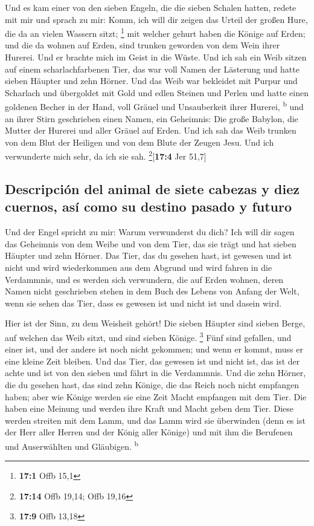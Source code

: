  Und es kam einer von den sieben Engeln, die die sieben
Schalen hatten, redete mit mir und sprach zu mir: Komm, ich will dir
zeigen das Urteil der großen Hure, die da an vielen Wassern sitzt;
\footnote{\textbf{17:1} Offb 15,1}  mit welcher gehurt
haben die Könige auf Erden; und die da wohnen auf Erden, sind trunken
geworden von dem Wein ihrer Hurerei.  Und er brachte mich
im Geist in die Wüste. Und ich sah ein Weib sitzen auf einem
scharlachfarbenen Tier, das war voll Namen der Lästerung und hatte
sieben Häupter und zehn Hörner.  Und das Weib war
bekleidet mit Purpur und Scharlach und übergoldet mit Gold und edlen
Steinen und Perlen und hatte einen goldenen Becher in der Hand, voll
Gräuel und Unsauberkeit ihrer Hurerei, \textsuperscript{b}
 und an ihrer Stirn geschrieben einen Namen, ein
Geheimnis: Die große Babylon, die Mutter der Hurerei und aller Gräuel
auf Erden.  Und ich sah das Weib trunken von dem Blut der
Heiligen und von dem Blute der Zeugen Jesu. Und ich verwunderte mich
sehr, da ich sie sah. \footnote{\textbf{17:14} Offb 19,14; Offb 19,16}{[}\textbf{17:4}
Jer 51,7{]}

\hypertarget{descripciuxf3n-del-animal-de-siete-cabezas-y-diez-cuernos-asuxed-como-su-destino-pasado-y-futuro}{%
\subsection{Descripción del animal de siete cabezas y diez cuernos, así
como su destino pasado y
futuro}\label{descripciuxf3n-del-animal-de-siete-cabezas-y-diez-cuernos-asuxed-como-su-destino-pasado-y-futuro}}

 Und der Engel spricht zu mir: Warum verwunderst du dich?
Ich will dir sagen das Geheimnis von dem Weibe und von dem Tier, das sie
trägt und hat sieben Häupter und zehn Hörner.  Das Tier,
das du gesehen hast, ist gewesen und ist nicht und wird wiederkommen aus
dem Abgrund und wird fahren in die Verdammnis, und es werden sich
verwundern, die auf Erden wohnen, deren Namen nicht geschrieben stehen
in dem Buch des Lebens von Anfang der Welt, wenn sie sehen das Tier,
dass es gewesen ist und nicht ist und dasein wird.

 Hier ist der Sinn, zu dem Weisheit gehört! Die sieben
Häupter sind sieben Berge, auf welchen das Weib sitzt, und sind sieben
Könige. \footnote{\textbf{17:9} Offb 13,18}  Fünf sind
gefallen, und einer ist, und der andere ist noch nicht gekommen; und
wenn er kommt, muss er eine kleine Zeit bleiben.  Und das
Tier, das gewesen ist und nicht ist, das ist der achte und ist von den
sieben und fährt in die Verdammnis.  Und die zehn Hörner,
die du gesehen hast, das sind zehn Könige, die das Reich noch nicht
empfangen haben; aber wie Könige werden sie eine Zeit Macht empfangen
mit dem Tier.  Die haben eine Meinung und werden ihre
Kraft und Macht geben dem Tier.  Diese werden streiten
mit dem Lamm, und das Lamm wird sie überwinden (denn es ist der Herr
aller Herren und der König aller Könige) und mit ihm die Berufenen und
Auserwählten und Gläubigen. \textsuperscript{b}

